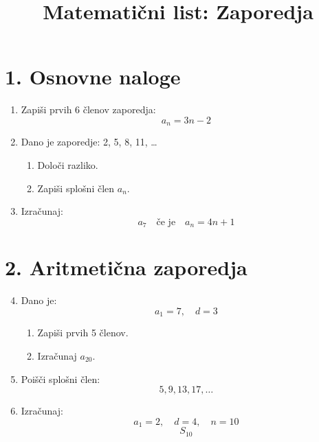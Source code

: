 \documentclass[a4paper,12pt]{article}
\title{Matematični list: Zaporedja}
\date{}
\begin{document}
\maketitle

\section*{1. Osnovne naloge}

\begin{enumerate}
\item Zapiši prvih 6 členov zaporedja:
\[
a_n = 3n - 2
\]
\vspace{2cm}

\item Dano je zaporedje: 2, 5, 8, 11, \dots

\begin{enumerate}
\item Določi razliko.
\vspace{1.5cm}
\item Zapiši splošni člen \( a_n \).
\vspace{1.5cm}
\end{enumerate}

\item Izračunaj:
\[
a_7 \quad \text{če je} \quad a_n = 4n + 1
\]
\vspace{2cm}

\end{enumerate}

\section*{2. Aritmetična zaporedja}

\begin{enumerate}
\setcounter{enumi}{3}

\item Dano je:
\[
a_1 = 7, \quad d = 3
\]

\begin{enumerate}
\item Zapiši prvih 5 členov.
\vspace{1.5cm}
\item Izračunaj \( a_{20} \).
\vspace{1.5cm}
\end{enumerate}

\item Poišči splošni člen:
\[
5, 9, 13, 17, \dots
\]
\vspace{2cm}

\item Izračunaj:
\[
a_1 = 2, \quad d = 4, \quad n = 10
\]
\[
S_{10}
\]
\vspace{2cm}

\end{enumerate}
\end{document}
